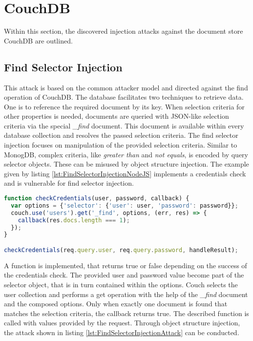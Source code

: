 \section{CouchDB}
Within this section, the discovered injection attacks against the document store CouchDB are outlined.

\subsection{Find Selector Injection}
This attack is based on the common attacker model and directed against the find operation of CouchDB. The database facilitates two techniques to retrieve data. One is to reference the required document by its key. When selection criteria for other properties is needed, documents are queried with JSON-like selection criteria via the special \emph{\_find} document. This document is available within every database collection and resolves the passed selection criteria. The find selector injection focuses on manipulation of the provided selection criteria. Similar to MonogDB, complex criteria, like \emph{greater than} and \emph{not equals}, is encoded by query selector objects. These can be misused by object structure injection. The example given by listing \ref{lst:FindSelectorInjectionNodeJS} implements a credentials check and is vulnerable for find selector injection. \\

\begin{lstlisting}[caption={Vulnerable NodeJS example for find selector injection against CouchDB}, label={lst:FindSelectorInjectionNodeJS}, language=JavaScript]
function checkCredentials(user, password, callback) {
  var options = {'selector': {'user': user, 'password': password}};
  couch.use('users').get('_find', options, (err, res) => {
    callback(res.docs.length === 1);
  });
}

checkCredentials(req.query.user, req.query.password, handleResult);
\end{lstlisting}

A function is implemented, that returns true or false depending on the success of the credentials check. The provided user and password value become part of the selector object, that is in turn contained within the options. Couch selects the user collection and performs a get operation with the help of the \emph{\_find} document and the composed options. Only when exactly one document is found that matches the selection criteria, the callback returns true. The described function is called with values provided by the request. Through object structure injection, the attack shown in listing \ref{lst:FindSelectorInjectionAttack} can be conducted. \\

